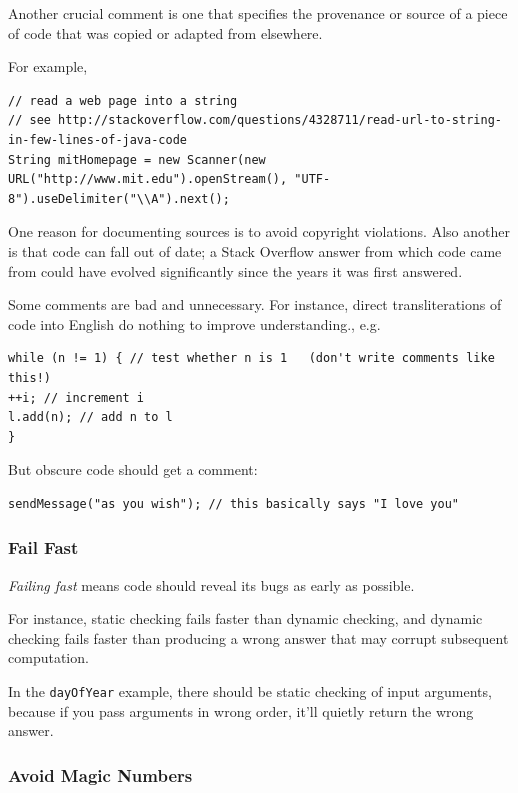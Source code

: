 \documentclass[10pt]{amsart}
\begin{document}
Another crucial comment is one that specifies the provenance or source of a piece of code that was copied or adapted from elsewhere. 

For example,

\begin{verbatim}
// read a web page into a string
// see http://stackoverflow.com/questions/4328711/read-url-to-string-in-few-lines-of-java-code
String mitHomepage = new Scanner(new URL("http://www.mit.edu").openStream(), "UTF-8").useDelimiter("\\A").next();
\end{verbatim}

One reason for documenting sources is to avoid copyright violations. Also another is that code can fall out of date; a Stack Overflow answer from which code came from could have evolved significantly since the years it was first answered.

Some comments are bad and unnecessary. For instance, direct transliterations of code into English do nothing to improve understanding., e.g.

\begin{verbatim}
while (n != 1) { // test whether n is 1   (don't write comments like this!)
++i; // increment i
l.add(n); // add n to l
}
\end{verbatim}

But obscure code should get a comment:
\begin{verbatim}
sendMessage("as you wish"); // this basically says "I love you"
\end{verbatim}

\subsubsection{Fail Fast}

\emph{Failing fast} means code should reveal its bugs as early as possible. 

For instance, static checking fails faster than dynamic checking, and dynamic checking fails faster than producing a wrong answer that may corrupt subsequent computation.

In the \verb|dayOfYear| example, there should be static checking of input arguments, because if you pass arguments in wrong order, it'll quietly return the wrong answer.

\subsubsection{Avoid Magic Numbers}
\end{document}
